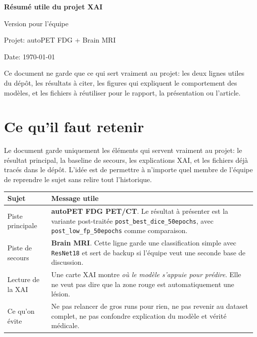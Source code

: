 \documentclass[11pt,a4paper]{article}
\begin{document}
\begin{titlepage}
\centering
\vspace*{1.5cm}

{\LARGE\bfseries Résumé utile du projet XAI\par}
\vspace{0.5cm}
{\large Version pour l'\'equipe\par}
\vspace{1cm}

{\large Projet: autoPET FDG + Brain MRI\par}
\vspace{0.3cm}
{\large Date: \today\par}
\vspace{1.8cm}

\begin{minipage}{0.88\textwidth}
\small
Ce document ne garde que ce qui sert vraiment au projet: les deux lignes utiles
du dépôt, les résultats à citer, les figures qui expliquent le comportement des
modèles, et les fichiers à réutiliser pour le rapport, la présentation ou
l'article.
\end{minipage}

\vfill
\end{titlepage}

\section{Ce qu'il faut retenir}

Le document garde uniquement les éléments qui servent vraiment au projet: le
résultat principal, la baseline de secours, les explications XAI, et les
fichiers déjà tracés dans le dépôt. L'idée est de permettre à n'importe quel
membre de l'équipe de reprendre le sujet sans relire tout l'historique.

\begin{tabularx}{\linewidth}{L{4.3cm}Y}
\toprule
\textbf{Sujet} & \textbf{Message utile} \\
\midrule
Piste principale & \textbf{autoPET FDG PET/CT}. Le résultat à présenter est la variante post-traitée \texttt{post\_best\_dice\_50epochs}, avec \texttt{post\_low\_fp\_50epochs} comme comparaison. \\
Piste de secours & \textbf{Brain MRI}. Cette ligne garde une classification simple avec \texttt{ResNet18} et sert de backup si l'équipe veut une seconde base de discussion. \\
Lecture de la XAI & Une carte XAI montre \emph{où le modèle s'appuie pour prédire}. Elle ne veut pas dire que la zone rouge est automatiquement une lésion. \\
Ce qu'on évite & Ne pas relancer de gros runs pour rien, ne pas revenir au dataset complet, ne pas confondre explication du modèle et vérité médicale. \\
\bottomrule
\end{tabularx}
\end{document}

